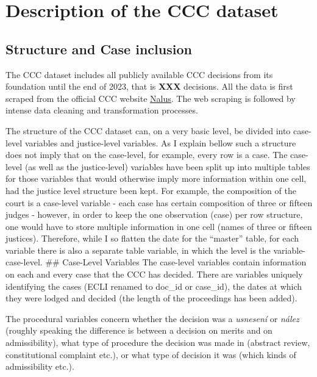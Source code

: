 \documentclass[
  11pt,
]{article}
\begin{document}
\hypertarget{description-of-the-ccc-dataset}{%
\section{Description of the CCC
dataset}\label{description-of-the-ccc-dataset}}

\hypertarget{structure-and-case-inclusion}{%
\subsection{Structure and Case
inclusion}\label{structure-and-case-inclusion}}

The CCC dataset includes all publicly available CCC decisions from its
foundation until the end of 2023, that is \textbf{XXX} decisions. All
the data is first scraped from the official CCC website
\href{https://nalus.usoud.cz/Search/Search.aspx}{Nalus}. The web
scraping is followed by intense data cleaning and transformation
processes.

The structure of the CCC dataset can, on a very basic level, be divided
into case-level variables and justice-level variables. As I explain
bellow such a structure does not imply that on the case-level, for
example, every row is a case. The case-level (as well as the
justice-level) variables have been split up into multiple tables for
those variables that would otherwise imply more information within one
cell, had the justice level structure been kept. For example, the
composition of the court is a case-level variable - each case has
certain composition of three or fifteen judges - however, in order to
keep the one observation (case) per row structure, one would have to
store multiple information in one cell (names of three or fifteen
justices). Therefore, while I so flatten the date for the ``master''
table, for each variable there is also a separate table variable, in
which the level is the variable-case-level. \#\# Case-Level Variables
The case-level variables contain information on each and every case that
the CCC has decided. There are variables uniquely identifying the cases
(ECLI renamed to doc\_id or case\_id), the dates at which they were
lodged and decided (the length of the proceedings has been added).

The procedural variables concern whether the decision was a
\emph{usnesení} or \emph{nález} (roughly speaking the difference is
between a decision on merits and on admissibility), what type of
procedure the decision was made in (abstract review, constitutional
complaint etc.), or what type of decision it was (which kinds of
admissibility etc.).
\end{document}

